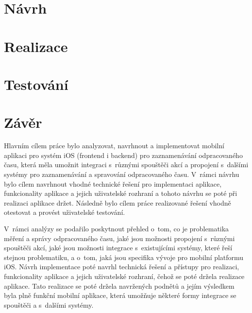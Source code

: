 

\chapter{Návrh}



\chapter{Realizace}



\chapter{Testování}



%

\chapter*{Závěr}

Hlavním cílem práce bylo analyzovat, navrhnout a implementovat mobilní aplikaci pro systém iOS (frontend i backend) pro zaznamenávání odpracovaného času, která měla umožnit integraci s~různými spouštěči akcí a propojení s~dalšími systémy pro zaznamenávání a spravování odpracovaného času. V~rámci návrhu bylo cílem navrhnout vhodné technické řešení pro implementaci aplikace, funkcionality aplikace a jejich uživatelské rozhraní a tohoto návrhu se poté při realizaci aplikace držet. Následně bylo cílem práce realizované řešení vhodně otestovat a provést uživatelské testování. 

V~rámci analýzy se podařilo poskytnout přehled o~tom, co je problematika měření a správy odpracovaného času, jaké jsou možnosti propojení s~různými spouštěči akcí, jaké jsou možnosti integrace s~existujícími systémy, které řeší stejnou problematiku, a o~tom, jaká jsou specifika vývoje pro mobilní platformu iOS. Návrh implementace poté navrhl technická řešení a přístupy pro realizaci, funkcionality aplikace a jejich uživatelské rozhraní, čehož se poté držela realizace aplikace. Tato realizace se poté držela navržených podnětů a jejím výsledkem byla plně funkční mobilní aplikace, která umožňuje některé formy integrace se spouštěči a s~dalšími systémy.

